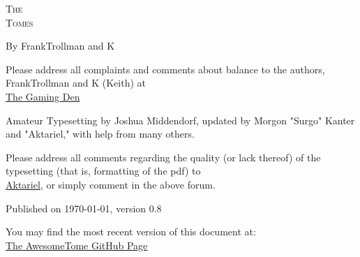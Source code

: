 \pagestyle{plain}

\begin{center} \Huge

\textsc{The\\
Tomes\\
}\end{center}

\vspace{2cm}
\begin{center}\large By FrankTrollman and K\end{center}

\newpage

\vspace*{4in}

\noindent Please address all complaints and comments about balance to the authors, FrankTrollman and K (Keith) at\\
\href{http://tgdmb.com/viewforum.php?f=1}{The Gaming Den}

\vspace{0.2in}



\noindent Amateur Typesetting by Joshua Middendorf, updated by Morgon "Surgo" Kanter and "Aktariel," with help from many others.\\

\vspace{0.2in}

\noindent Please address all comments regarding the quality (or lack thereof) of the typesetting (that is, formatting of the pdf) to\\ 
\href{mailto:aktariel@gmail.com}{Aktariel}, or simply comment in the above forum.\\





\vspace{1in}

\noindent Published on \today, version 0.8\\
\vspace{0.1in}

\noindent You may find the most recent version of this document at:\\
\href{https://github.com/ideologysec/awesometome}{The AwesomeTome GitHub Page}

\newpage
